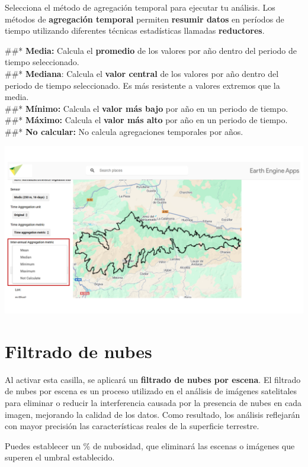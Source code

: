 \documentclass[
]{book}
\begin{document}
Selecciona el método de agregación temporal para ejecutar tu análisis. Los métodos de \textbf{agregación temporal} permiten \textbf{resumir datos} en períodos de tiempo utilizando diferentes técnicas estadísticas llamadas \textbf{reductores}.

\#\#* \textbf{Media:} Calcula el \textbf{promedio} de los valores por año dentro del periodo de tiempo seleccionado.\\
\#\#* \textbf{Mediana}: Calcula el \textbf{valor central} de los valores por año dentro del periodo de tiempo seleccionado. Es más resistente a valores extremos que la media.\\
\#\#* \textbf{Mínimo:} Calcula el \textbf{valor más bajo} por año en un periodo de tiempo.\\
\#\#* \textbf{Máximo:} Calcula el \textbf{valor más alto} por año en un periodo de tiempo.\\
\#\#* \textbf{No calcular:} No calcula agregaciones temporales por años.

\includegraphics{assets/interannualAggregation.png}

\chapter{Filtrado de nubes}\label{filtrado-nubes}

Al activar esta casilla, se aplicará un \textbf{filtrado de nubes por escena}. El filtrado de nubes por escena es un proceso utilizado en el análisis de imágenes satelitales para eliminar o reducir la interferencia causada por la presencia de nubes en cada imagen, mejorando la calidad de los datos. Como resultado, los análisis reflejarán con mayor precisión las características reales de la superficie terrestre.

Puedes establecer un \% de nubosidad, que eliminará las escenas o imágenes que superen el umbral establecido.
\end{document}
